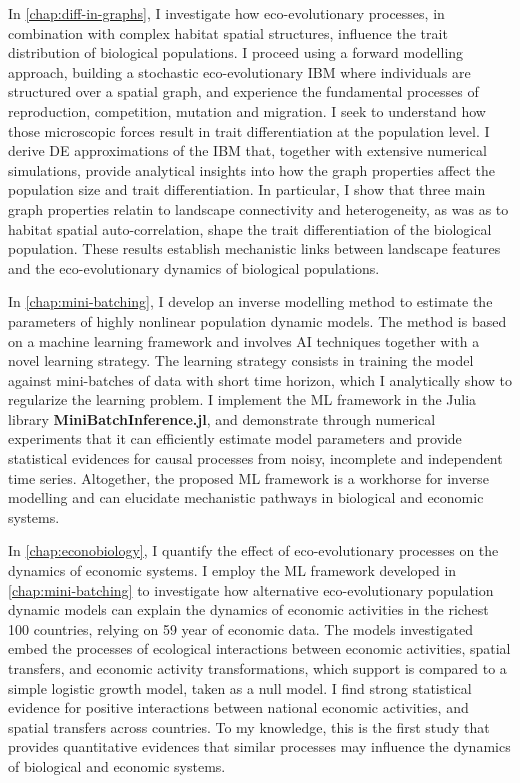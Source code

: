 In \cref{chap:diff-in-graphs}, I investigate how eco-evolutionary processes, in combination with complex habitat spatial structures, influence the trait distribution of biological populations. 
I proceed using a forward modelling approach, building a stochastic eco-evolutionary IBM where individuals are structured over a spatial graph, and experience the fundamental processes of reproduction, competition, mutation and migration. I seek to understand how those microscopic forces result in trait differentiation at the population level. I derive DE approximations of the IBM that, together with extensive numerical simulations, provide analytical insights into how the graph properties affect the population size and trait differentiation. In particular, I show that three main graph properties relatin to landscape connectivity and heterogeneity, as was as to habitat spatial auto-correlation, shape the trait differentiation of the biological population. These results establish mechanistic links between landscape features and the eco-evolutionary dynamics of biological populations.

In \cref{chap:mini-batching}, I develop an inverse modelling method to estimate the parameters of highly nonlinear population dynamic models. The method is based on a machine learning framework and involves AI techniques together with a novel learning strategy. The learning strategy consists in training the model against mini-batches of data with short time horizon, which I analytically show to regularize the learning problem. I implement the ML framework in the Julia library \textbf{MiniBatchInference.jl}, and demonstrate through numerical experiments that it can efficiently estimate model parameters and provide statistical evidences for causal processes from noisy, incomplete and independent time series. Altogether, the proposed ML framework is a workhorse for inverse modelling and can elucidate mechanistic pathways in biological and economic systems.

In \cref{chap:econobiology}, I quantify the effect of eco-evolutionary processes on the dynamics of economic systems. I employ the ML framework developed in \cref{chap:mini-batching} to investigate how alternative eco-evolutionary population dynamic models can explain the dynamics of economic activities in the richest 100 countries, relying on 59 year of economic data. The models investigated embed the processes of ecological interactions between economic activities, spatial transfers, and economic activity transformations, which support is compared to a simple logistic growth model, taken as a null model. I find strong statistical evidence for positive interactions between national economic activities, and spatial transfers across countries. To my knowledge, this is the first study that provides quantitative evidences that similar processes may influence the dynamics of biological and economic systems.

